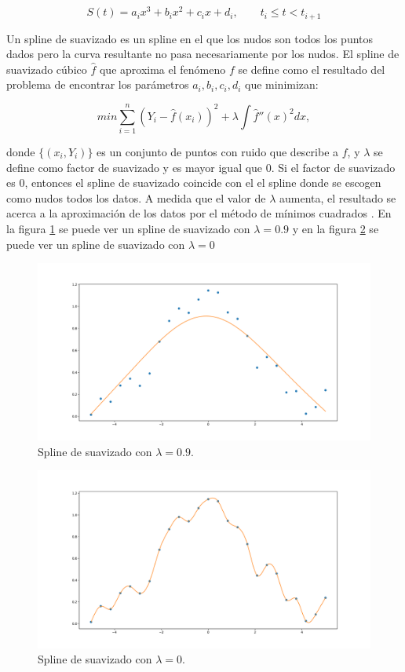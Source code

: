 $$S(t) = a_ix^3 + b_ix^2 + c_ix + d_i, \qquad t_i \leq t < t_{i+1}$$

Un spline de suavizado es un spline en el que los nudos son todos los puntos dados pero la curva resultante no pasa necesariamente por los nudos. El spline de suavizado cúbico $\hat{f}$ que aproxima el fenómeno $f$ se define como el resultado del problema de encontrar los parámetros $a_i, b_i, c_i, d_i$ que minimizan:

$$min \sum_{i=1}^n (Y_i - \hat{f}(x_i))^2 + \lambda \int \hat{f}''(x)^2 dx,$$

donde $\{(x_i, Y_i)\}$ es un conjunto de puntos con ruido que describe a $f$, y $\lambda$ se define como factor de suavizado y es mayor igual que 0. Si el factor de suavizado es 0, entonces el spline de suavizado coincide con el el spline donde se escogen como nudos todos los datos. A medida que el valor de $\lambda$ aumenta, el resultado se acerca a la aproximación de los datos por el método de mínimos cuadrados \cite{green1993nonparametric}. En la figura \ref{fig:spline_0.1} se puede ver un spline de suavizado con $\lambda=0.9$ y en la figura \ref{fig:spline_1} se puede ver un spline de suavizado con $\lambda=0$

\begin{figure}[h]
    \centering
    \includegraphics[width=\textwidth]{"figures/spline_0.1.pdf"}
    \caption{Spline de suavizado con $\lambda = 0.9$.}
    \label{fig:spline_0.1}
\end{figure}

\begin{figure}[h]
    \centering
    \includegraphics[width=\textwidth]{"figures/spline_1.pdf"}
    \caption{Spline de suavizado con $\lambda = 0$.}
    \label{fig:spline_1}
\end{figure}


